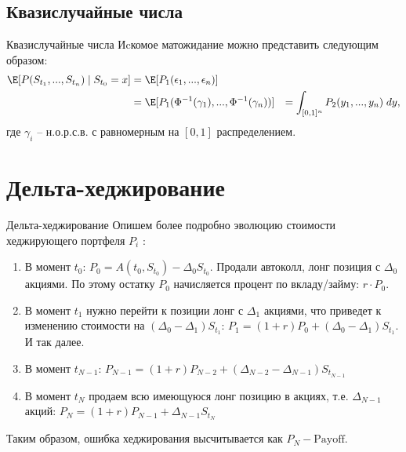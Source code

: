 \documentclass[aspectratio=169]{beamer}
\begin{document}
    \subsection{Квазислучайные числа}
    \begin{frame}{Квазислучайные числа}
        Иcкомое матожидание можно представить следующим образом: 
    \begin{align*}
        \E[P(S_{t_1}, ..., S_{t_n})\;|\; S_{t_0} = x]
        &= \E [P_1(\epsilon_1, ..., \epsilon_n)]\\
        &= \E [P_1(\Phi^{-1}(\gamma_1), ..., \Phi^{-1}(\gamma_n))]
        &= \int_{[0,1]^n} P_2(y_1, ..., y_n)\; dy,
    \end{align*}
    где $\gamma_i$ -- н.о.р.с.в. с равномерным на $[0,1]$ распределением.
    \end{frame}
    
    

    

    \section{Дельта-хеджирование}
    \begin{frame}{Дельта-хеджирование}
        Опишем более подробно эволюцию стоимости хеджирующего портфеля $P_i$ :
    \begin{enumerate} 
      \item В момент $t_0$: $P_{0} = A(t_0, S_{t_0}) - \Delta_{0} S_{t_0}$. Продали автоколл, лонг позиция с $\Delta_{0}$ акциями. По этому остатку $P_{0}$ начисляется процент по вкладу/займу: $r\cdot P_{0}$.
      
      
      \item В момент $t_1$ нужно перейти к позиции лонг с $\Delta_{1}$ акциями, что приведет к изменению стоимости на $(\Delta_0-\Delta_1)S_{t_1}$: $P_{1} = (1+r)P_{0} + (\Delta_0-\Delta_1)S_{t_1}$. И так далее.
    
      \item В момент $t_{N-1}$: $P_{N-1} = (1+r)P_{N-2} + (\Delta_{N-2}-\Delta_{N-1})S_{t_{N-1}}$
    
      \item В момент $t_N$ продаем всю имеющуюся лонг позицию в акциях, т.е. $\Delta_{N-1}$ акций: $P_{N} = (1+r)P_{N-1} + \Delta_{N-1}S_{t_{N}}$
    \end{enumerate}
    Таким образом, ошибка хеджирования высчитывается как $P_N-\text{Payoff}$.   
    \end{frame}
\end{document}

